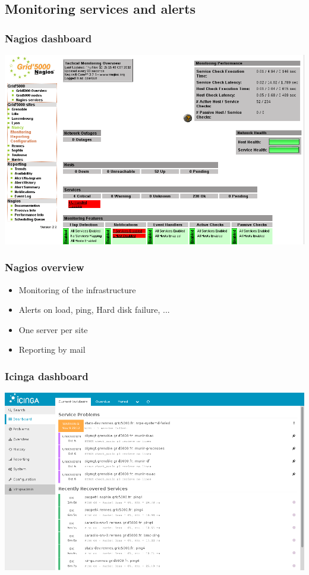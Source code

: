 \documentclass[11pt,compress]{beamer}
\begin{document}
\subsection{Monitoring services and alerts}
\begin{frame}
\frametitle{Nagios dashboard}
\begin{center}
\includegraphics[scale=0.29]{figures/nagios}
\end{center}
\end{frame}

\begin{frame}
\frametitle{Nagios overview}
\begin{itemize}
\item Monitoring of the infrastructure
\item Alerts on load, ping, Hard disk failure, ...
\item One server per site
\item Reporting by mail 
\end{itemize}
\end{frame}

\begin{frame}
\frametitle{Icinga dashboard}
\begin{center}
\includegraphics[scale=0.30]{figures/icinga}
\end{center}
\end{frame}
\end{document}
